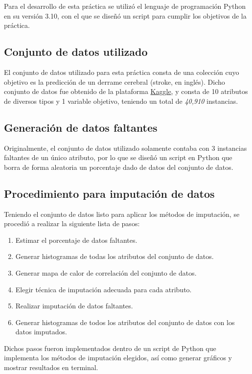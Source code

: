 Para el desarrollo de esta práctica se utilizó el lenguaje de programación Python en su versión 3.10, con el que se diseñó un script para cumplir los objetivos de la práctica.

\subsection{Conjunto de datos utilizado}
El conjunto de datos utilizado para esta práctica consta de una colección cuyo objetivo es la predicción de un derrame cerebral (stroke, en inglés). Dicho conjunto de datos fue obtenido de la plataforma \href{https://www.kaggle.com/datasets/prosperchuks/health-dataset?select=stroke_data.csv}{Kaggle}, y consta de 10 atributos de diversos tipos y 1 variable objetivo, teniendo un total de \emph{40,910} instancias.

\subsection{Generación de datos faltantes}
Originalmente, el conjunto de datos utilizado solamente contaba con 3 instancias faltantes de un único atributo, por lo que se diseñó un script en Python que borra de forma aleatoria un porcentaje dado de datos del conjunto de datos.

\subsection{Procedimiento para imputación de datos}
Teniendo el conjunto de datos listo para aplicar los métodos de imputación, se procedió a realizar la siguiente lista de pasos:

\begin{enumerate}
	\item Estimar el porcentaje de datos faltantes.
	\item Generar histogramas de todas los atributos del conjunto de datos.
	\item Generar mapa de calor de correlación del conjunto de datos.
	\item Elegir técnica de imputación adecuada para cada atributo.
	\item Realizar imputación de datos faltantes.
	\item Generar histogramas de todos los atributos del conjunto de datos con los datos imputados.
\end{enumerate}

Dichos pasos fueron implementados dentro de un script de Python que implementa los métodos de imputación elegidos, así como generar gráficos y mostrar resultados en terminal.
